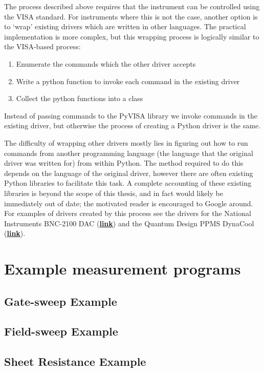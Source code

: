 \documentclass[edeposit,fullpage,draftthesis]{uiucthesis2009}
\begin{document}
\begin{appendices}
    The process described above requires that the instrument can be controlled using the VISA standard.
    For instruments where this is not the case, another option is to `wrap' existing drivers which are
    written in other languages. The practical implementation is more complex, but this wrapping process is logically
    similar to the VISA-based process: 
    \begin{enumerate}
        \item Enumerate the commands which the other driver accepts
        \item Write a python function to invoke each command in the existing driver
        \item Collect the python functions into a class
    \end{enumerate}
    Instead of passing commands to the PyVISA library we invoke commands in the existing driver, but otherwise
    the process of creating a Python driver is the same.
    
    The difficulty of wrapping other drivers mostly lies in figuring out how to run commands from another
    programming language (the language that the original driver was written for) from within Python.
    The method required to do this depends on the language of the original driver, however there are often
    existing Python libraries to facilitate this task. A complete accounting of these existing libraries
    is beyond the scope of this thesis, and in fact would likely be immediately out of date;
    the motivated reader is encouraged to Google around. For examples
    of drivers created by this process see the drivers for the National Instruments BNC-2100 DAC
    (\href{https://github.com/masonlab/labdrivers/blob/master/labdrivers/ni/bnc2110.py}{\textbf{link}})
    and the Quantum Design PPMS DynaCool 
    (\href{https://github.com/masonlab/labdrivers/blob/master/labdrivers/quantumdesign/dynacool.py}{\textbf{link}}).
    
    
\section{Example measurement programs}
\subsection{Gate-sweep Example}
\subsection{Field-sweep Example}
\subsection{Sheet Resistance Example}

\end{appendices}

\backmatter


%
%
%
%

\end{document}
